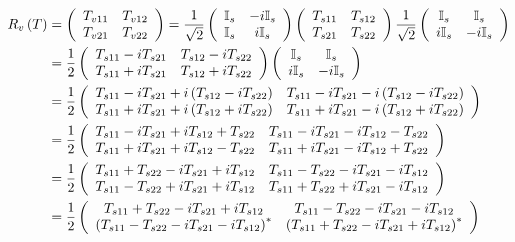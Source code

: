 \documentclass[aps,preprint]{revtex4}%
\begin{document}
\begin{align*}
R_{v}\left(  T\right)   &  =\left(
\begin{array}
[c]{cc}%
T_{v11} & T_{v12}\\
T_{v21} & T_{v22}%
\end{array}
\right)  =\frac{1}{\sqrt{2}}\left(
\begin{array}
[c]{cc}%
\mathbb{I}_{s} & -i\mathbb{I}_{s}\\
\mathbb{I}_{s} & i\mathbb{I}_{s}%
\end{array}
\right)  \left(
\begin{array}
[c]{cc}%
T_{s11} & T_{s12}\\
T_{s21} & T_{s22}%
\end{array}
\right)  \frac{1}{\sqrt{2}}\left(
\begin{array}
[c]{cc}%
\mathbb{I}_{s} & \mathbb{I}_{s}\\
i\mathbb{I}_{s} & -i\mathbb{I}_{s}%
\end{array}
\right) \\
&  =\frac{1}{2}\left(
\begin{array}
[c]{cc}%
T_{s11}-iT_{s21} & T_{s12}-iT_{s22}\\
T_{s11}+iT_{s21} & T_{s12}+iT_{s22}%
\end{array}
\right)  \left(
\begin{array}
[c]{cc}%
\mathbb{I}_{s} & \mathbb{I}_{s}\\
i\mathbb{I}_{s} & -i\mathbb{I}_{s}%
\end{array}
\right) \\
&  =\frac{1}{2}\left(
\begin{array}
[c]{cc}%
T_{s11}-iT_{s21}+i\left(  T_{s12}-iT_{s22}\right)  & T_{s11}-iT_{s21}-i\left(
T_{s12}-iT_{s22}\right) \\
T_{s11}+iT_{s21}+i\left(  T_{s12}+iT_{s22}\right)  & T_{s11}+iT_{s21}-i\left(
T_{s12}+iT_{s22}\right)
\end{array}
\right) \\
&  =\frac{1}{2}\left(
\begin{array}
[c]{cc}%
T_{s11}-iT_{s21}+iT_{s12}+T_{s22} & T_{s11}-iT_{s21}-iT_{s12}-T_{s22}\\
T_{s11}+iT_{s21}+iT_{s12}-T_{s22} & T_{s11}+iT_{s21}-iT_{s12}+T_{s22}%
\end{array}
\right) \\
&  =\frac{1}{2}\left(
\begin{array}
[c]{cc}%
T_{s11}+T_{s22}-iT_{s21}+iT_{s12} & T_{s11}-T_{s22}-iT_{s21}-iT_{s12}\\
T_{s11}-T_{s22}+iT_{s21}+iT_{s12} & T_{s11}+T_{s22}+iT_{s21}-iT_{s12}%
\end{array}
\right) \\
&  =\frac{1}{2}\left(
\begin{array}
[c]{cc}%
T_{s11}+T_{s22}-iT_{s21}+iT_{s12} & T_{s11}-T_{s22}-iT_{s21}-iT_{s12}\\
\left(  T_{s11}-T_{s22}-iT_{s21}-iT_{s12}\right)  ^{\ast} & \left(
T_{s11}+T_{s22}-iT_{s21}+iT_{s12}\right)  ^{\ast}%
\end{array}
\right)
\end{align*}
\end{document}
